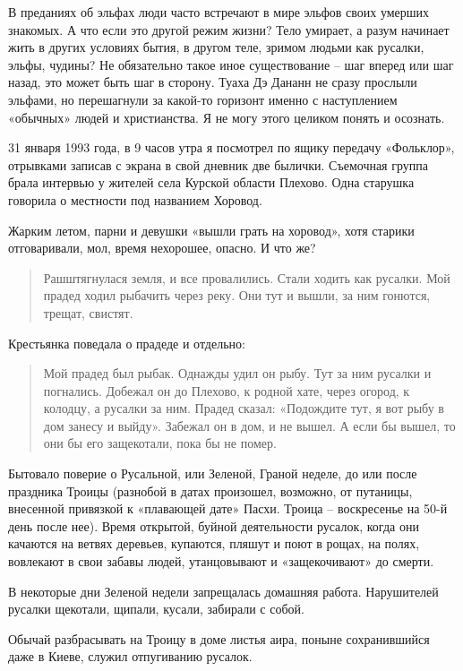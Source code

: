 В преданиях об эльфах люди часто встречают в мире эльфов своих умерших знакомых. А что если это другой режим жизни? Тело умирает, а разум начинает жить в других условиях бытия, в другом теле, зримом людьми как русалки, эльфы, чудины? Не обязательно такое иное существование – шаг вперед или шаг назад, это может быть шаг в сторону. Туаха Дэ Дананн не сразу прослыли эльфами, но перешагнули за какой-то горизонт именно с наступлением «обычных» людей и христианства. Я не могу этого целиком понять и осознать.

31 января 1993 года, в 9 часов утра я посмотрел по ящику передачу «Фольклор», отрывками записав с экрана в свой дневник две былички. Съемочная группа брала интервью у жителей села Курской области Плехово. Одна старушка говорила о местности под названием Хоровод. 

Жарким летом, парни и девушки «вышли грать на хоровод», хотя старики отговаривали, мол, время нехорошее, опасно. И что же? 

\begin{quotation} 
Рашштягнулася земля, и все провалились. Стали ходить как русалки. Мой прадед ходил рыбачить через реку. Они тут и вышли, за ним гонются, трещат, свистят.
\end{quotation} 

Крестьянка поведала о прадеде и отдельно:

\begin{quotation} 
Мой прадед был рыбак. Однажды удил он рыбу. Тут за ним русалки и погнались. Добежал он до Плехово, к родной хате, через огород, к колодцу, а русалки за ним. Прадед сказал: «Подождите тут, я вот рыбу в дом занесу и выйду». Забежал он в дом, и не вышел. А если бы вышел, то они бы его защекотали, пока бы не помер.
\end{quotation} 

Бытовало поверие о Русальной, или Зеленой, Граной неделе, до или после праздника Троицы (разнобой в датах произошел, возможно, от путаницы, внесенной привязкой к «плавающей дате» Пасхи. Троица – воскресенье на 50-й день после нее). Время открытой, буйной деятельности русалок, когда они качаются на ветвях деревьев, купаются, пляшут и поют в рощах, на полях, вовлекают в свои забавы людей, утанцовывают и «защекочивают» до смерти.

В некоторые дни Зеленой недели запрещалась домашняя работа. Нарушителей русалки щекотали, щипали, кусали, забирали с собой.

Обычай разбрасывать на Троицу в доме листья аира, поныне сохранившийся даже в Киеве, служил отпугиванию русалок. 

